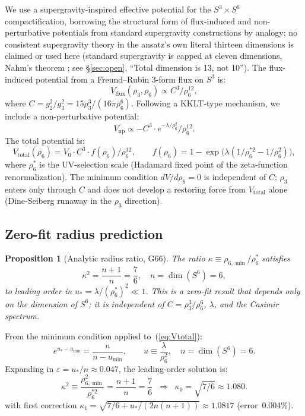 \documentclass[12pt,a4paper]{article}
\newtheorem{proposition}[lemma]{Proposition}
\begin{document}
We use a supergravity-inspired effective potential for the $S^3\times S^6$
compactification, borrowing the structural form of flux-induced and non-perturbative
potentials from standard supergravity constructions by analogy; no consistent
supergravity theory in the ansatz's own literal thirteen dimensions is claimed or used
here (standard supergravity is capped at eleven dimensions, Nahm's theorem
\cite{Nahm1978}; see \S\ref{sec:open}, ``Total dimension is 13, not 10''). The
flux-induced potential from a Freund--Rubin 3-form flux on $S^3$ is:
\begin{equation}
  V_{\mathrm{flux}}(\rho_3,\rho_6) \propto C^3/\rho_6^{12},
\end{equation}
where $C = g_2^2/g_3^2 = 15\rho_3^3/(16\pi\rho_6^6)$. Following a KKLT-type mechanism,
we include a non-perturbative potential:
\begin{equation}
  V_{\mathrm{np}} \propto -C^3\cdot e^{-\lambda/\rho_6^2}/\rho_6^{12}.
\end{equation}
The total potential is:
\begin{equation}
  V_{\mathrm{total}}(\rho_6) = V_0\cdot C^3\cdot f(\rho_6)/\rho_6^{12},
  \qquad f(\rho_6) = 1 - \exp\!\bigl(\lambda(1/\rho_6^{*2} - 1/\rho_6^2)\bigr),
  \label{eq:Vtotal}
\end{equation}
where $\rho_6^*$ is the UV-selection scale (Hadamard fixed point of the zeta-function
renormalization). The minimum condition $dV/d\rho_6=0$ is independent of $C$; $\rho_3$ enters
only through $C$ and does not develop a restoring force from $V_{\mathrm{total}}$ alone
(Dine-Seiberg runaway in the $\rho_3$ direction).

\subsection{Zero-fit radius prediction}
\label{sec:moduli-radius}

\begin{proposition}[Analytic radius ratio, G66]\label{prop:kappa}
  The ratio $\kappa \equiv \rho_{6,\min}/\rho_6^*$ satisfies
  \[
    \kappa^2 = \frac{n+1}{n} = \frac{7}{6}, \quad n = \dim(S^6) = 6,
  \]
  to leading order in $u_* = \lambda/(\rho_6^*)^2 \ll 1$.
  This is a zero-fit result that depends only on the dimension of $S^6$;
  it is independent of $C = \rho_3^3/\rho_6^6$, $\lambda$, and the Casimir spectrum.
\end{proposition}

From the minimum condition applied to~(\ref{eq:Vtotal}):
\begin{equation}
  e^{u_*-u_{\min}} = \frac{n}{n-u_{\min}}, \qquad
  u \equiv \frac{\lambda}{\rho_6^2},\quad n = \dim(S^6) = 6.
  \label{eq:min-cond}
\end{equation}
Expanding in $\varepsilon = u_*/n\approx 0.047$, the leading-order solution is:
\begin{equation}
  \kappa^2 \equiv \frac{\rho_{6,\min}^2}{\rho_6^{*2}} = \frac{n+1}{n} = \frac{7}{6}
  \;\;\Rightarrow\;\;
  \kappa_0 = \sqrt{7/6} \approx 1.080.
  \tag{G66}
\end{equation}
with first correction $\kappa_1 = \sqrt{7/6 + u_*/(2n(n+1))}\approx 1.0817$ (error~0.004\%).
\end{document}
